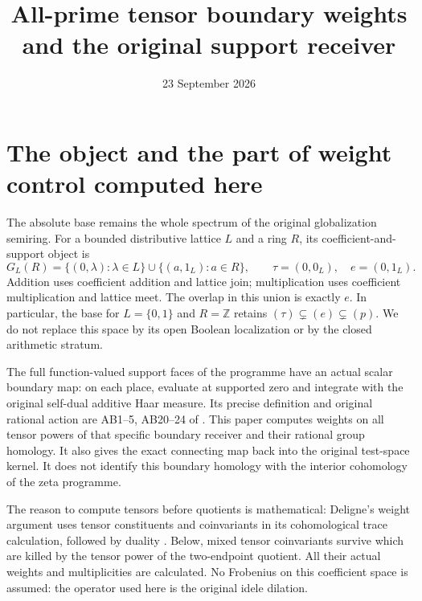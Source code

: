 \documentclass[11pt]{article}
\title{All-prime tensor boundary weights and the original support receiver}
\author{}
\date{23 September 2026}
\newcommand{\Z}{\mathbb Z}
\begin{document}
\maketitle

\section{The object and the part of weight control computed here}
The absolute base remains the whole spectrum of the original globalization
semiring. For a bounded distributive lattice $L$ and a ring $R$, its
coefficient-and-support object is
\[
 G_L(R)=\{(0,\lambda):\lambda\in L\}\cup\{(a,1_L):a\in R\},
 \qquad \tau=(0,0_L),\quad e=(0,1_L).
 \tag{BW1}
\]
Addition uses coefficient addition and lattice join; multiplication uses
coefficient multiplication and lattice meet. The overlap in this union is
exactly $e$. In particular, the base for $L=\{0,1\}$ and $R=\Z$ retains
$(\tau)\subsetneq(e)\subsetneq(p)$. We do not replace this space by its
open Boolean localization or by the closed arithmetic stratum.

The full function-valued support faces of the programme have an actual
scalar boundary map: on each place, evaluate at supported zero and
integrate with the original self-dual additive Haar measure. Its precise
definition and original rational action are AB1--5, AB20--24 of
\cite{AB}. This paper computes weights on all tensor powers of that
specific boundary receiver and their rational group homology. It also
gives the exact connecting map back into the original test-space kernel.
It does not identify this boundary homology with the interior cohomology
of the zeta programme.

The reason to compute tensors before quotients is mathematical:
Deligne's weight argument uses tensor constituents and coinvariants in
its cohomological trace calculation, followed by duality
\cite[1.3.13, 1.4.1--1.5.3, 1.8.4, 3.3.1--3.3.6]{Deligne}.
Below, mixed tensor coinvariants survive which are killed by the
tensor power of the two-endpoint quotient. All their actual weights
and multiplicities are calculated. No Frobenius on this coefficient
space is assumed: the operator used here is the original idele dilation.
\end{document}
